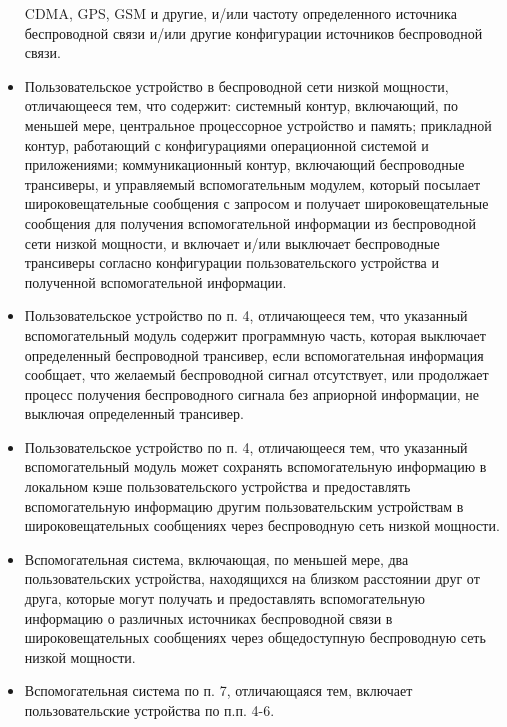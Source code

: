 \begin{itemize}
		CDMA, GPS, GSM и другие, и/или частоту определенного источника беспроводной связи и/или другие конфигурации источников беспроводной связи.
	\item Пользовательское устройство в беспроводной сети низкой мощности, отличающееся тем, что содержит:
		\subitem системный контур, включающий, по меньшей мере, центральное процессорное устройство и память; 
		\subitem прикладной контур, работающий с конфигурациями операционной системой и приложениями;
		\subitem коммуникационный контур, включающий беспроводные трансиверы, и управляемый вспомогательным модулем, который
		посылает широковещательные сообщения с запросом и получает широковещательные сообщения для получения вспомогательной информации из беспроводной
		сети низкой мощности, и включает и/или выключает беспроводные трансиверы согласно конфигурации пользовательского устройства и полученной вспомогательной информации.
	\item Пользовательское устройство по п. 4, отличающееся тем, что указанный вспомогательный модуль содержит программную часть, которая выключает определенный беспроводной
		трансивер, если вспомогательная информация сообщает, что желаемый беспроводной сигнал отсутствует, или продолжает процесс получения беспроводного сигнала без
		априорной информации, не выключая определенный трансивер.
	\item Пользовательское устройство по п. 4, отличающееся тем, что указанный вспомогательный модуль может сохранять вспомогательную информацию в локальном кэше
		пользовательского устройства и предоставлять вспомогательную информацию другим пользовательским устройствам в широковещательных сообщениях через беспроводную сеть
		низкой мощности.
	\item Вспомогательная система, включающая, по меньшей мере, два пользовательских устройства, находящихся на близком расстоянии друг от друга, которые могут получать и
		предоставлять вспомогательную информацию о различных источниках беспроводной связи в широковещательных сообщениях через общедоступную беспроводную сеть низкой мощности. 
	\item Вспомогательная система по п. 7, отличающаяся тем, включает пользовательские устройства по п.п. 4-6. 
\end{itemize}

